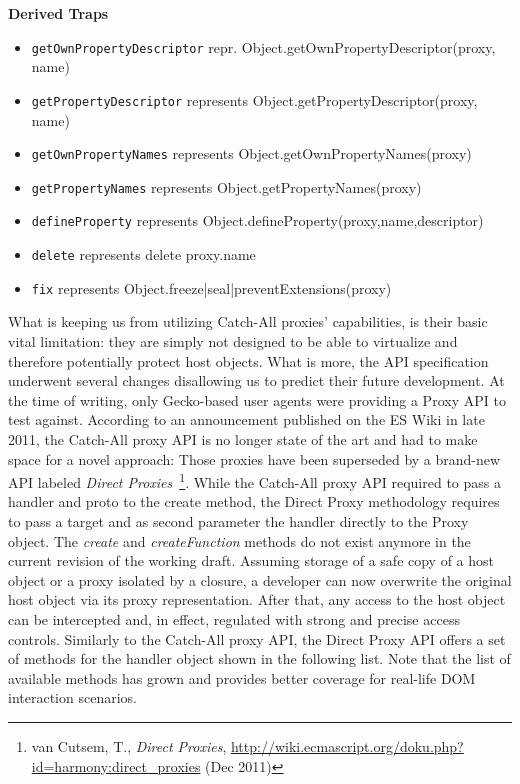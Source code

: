 \textbf{Derived Traps}
\begin{itemize}
  \item \texttt{getOwnPropertyDescriptor} repr. Object.getOwnPropertyDescriptor(proxy, name)
  \item \texttt{getPropertyDescriptor} represents Object.getPropertyDescriptor(proxy, name)
  \item \texttt{getOwnPropertyNames} represents Object.getOwnPropertyNames(proxy) 
  \item \texttt{getPropertyNames} represents Object.getPropertyNames(proxy)
  \item \texttt{defineProperty} represents Object.defineProperty(proxy,name,descriptor)
  \item \texttt{delete} represents delete proxy.name
  \item \texttt{fix} represents Object.{freeze|seal|preventExtensions}(proxy) 
\end{itemize}

      What is keeping us from utilizing Catch-All proxies' capabilities, is their basic vital limitation: they are simply not designed to be able to virtualize and therefore potentially protect host objects. What is more, the API specification underwent several changes disallowing us to predict their future development. At the time of writing, only Gecko-based user agents were providing a Proxy API to test against. According to an announcement published on the ES Wiki in late 2011, the Catch-All proxy API is no longer state of the art and had to make space for a novel approach: Those proxies have been superseded by a brand-new API labeled \textit{Direct Proxies}~\footnote{van Cutsem, T., \textit{Direct Proxies}, \url{http://wiki.ecmascript.org/doku.php?id=harmony:direct_proxies} (Dec 2011)}. While the Catch-All proxy API required to pass a handler and proto to the create method, the Direct Proxy methodology requires to pass a target and as second parameter the handler directly to the Proxy object. The \textit{create} and \textit{createFunction} methods do not exist anymore in the current revision of the working draft. Assuming storage of a safe copy of a host object or a proxy isolated by a closure, a developer can now overwrite the original host object via its proxy representation. After that, any access to the host object can be intercepted and, in effect, regulated with strong and precise access controls. Similarly to the Catch-All proxy API, the Direct Proxy API offers a set of methods for the handler object shown in the following list. Note that the list of available methods has grown and provides better coverage for real-life DOM interaction scenarios.\\

